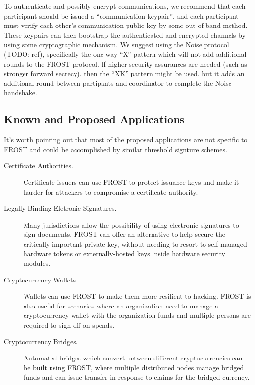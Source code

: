 To authenticate and possibly encrypt communications, we recommend that each
participant should be issued a ``communication keypair'', and each participant
must verify each other's communication public key by some out of band method.
These keypairs can then bootstrap the authenticated and encrypted channels by
using some cryptographic mechanism. We suggest using the Noise protocol (TODO:
ref), specifically the one-way ``X'' pattern which will not add additional
rounds to the FROST protocol. If higher security assurances are needed (such as
stronger forward secrecy), then the ``XK'' pattern might be used, but it adds an
additional round between partipants and coordinator to complete the Noise
handshake.

\subsection{Known and Proposed Applications}

It's worth pointing out that most of the proposed applications are not specific
to FROST and could be accomplished by similar threshold signture schemes.

\begin{description}
    \item[Certificate Authorities.] Certificate issuers can use FROST to protect
    issuance keys and make it harder for attackers to compromise a certificate
    authority.
    \item[Legally Binding Eletronic Signatures.] Many jurisdictions allow the
    possibility of using electronic signatures to sign documents. FROST can
    offer an alternative to help secure the critically important private key,
    without needing to resort to self-managed hardware tokens or
    externally-hosted keys inside hardware security modules.
    \item[Cryptocurrency Wallets.] Wallets can use FROST to make them more
    resilient to hacking. FROST is also useful for scenarios where an
    organization need to manage a cryptocurrency wallet with the organization
    funds and multiple persons are required to sign off on spends.
    \item[Cryptocurrency Bridges.] Automated bridges which convert between
    different cryptocurrencies can be built using FROST, where multiple
    distributed nodes manage bridged funds and can issue transfer in response
    to claims for the bridged currency.
\end{description}
